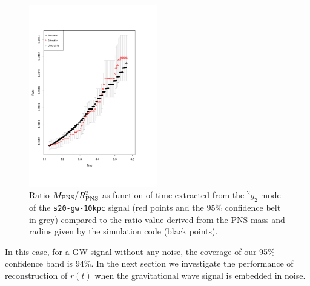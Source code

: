 \begin{figure}
 \centering
 \includegraphics[width=0.5\textwidth,height=0.3\textheight]{plots/ratio}
 \caption{Ratio $M_{\rm PNS}/R_{\rm PNS}^2$ as function of time extracted from the $\mbox{}^2 g_2$-mode of the {\tt s20-gw-10kpc} signal (red points and the 95\% confidence belt in grey) compared to the ratio value derived from the PNS mass and radius given by the simulation code (black points).} \label{fig:ratio}
\end{figure}


In this case, for a GW signal without any noise, the coverage of our 95\% confidence band is 94\%.
In the next section we investigate the performance of reconstruction of $r(t)$ when the gravitational wave
signal is embedded in noise.
